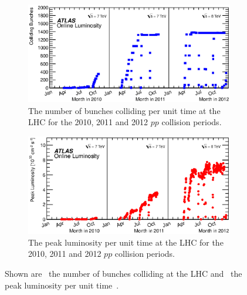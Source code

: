 \begin{figure}[htbp]
  \centering
    \begin{subfigure}[b]{0.95\textwidth}
      \includegraphics[width=\textwidth]{PartDetector/Plots/BunchesCollidingPerTime.eps}
      \caption{The number of bunches colliding per unit time at the LHC for the 2010, 2011 and 2012 $pp$ collision periods.}
      \label{fig:DetectorBunchesColliding}
    \end{subfigure}
  
    \begin{subfigure}[b]{0.95\textwidth}
      \includegraphics[width=\textwidth]{PartDetector/Plots/PeakLuminosityVsTime.eps}
      \caption{The peak luminosity per unit time at the LHC for the 2010, 2011 and 2012 $pp$ collision periods.}
      \label{fig:DetectorPeakLumi}
    \end{subfigure}
    \caption[Shown are the number of bunches colliding at the LHC and the peak luminosity per unit time.]{Shown are~ the number of bunches colliding at the LHC and~ the peak luminosity per unit time~\cite{Detector:LuminosityResults}.}
  \label{fig:DetectorPerformance}
\end{figure}

